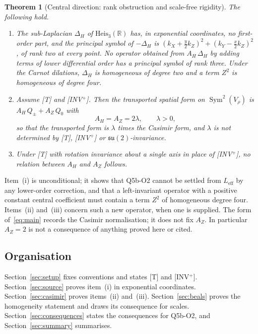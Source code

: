\documentclass[11pt,a4paper]{article}
\newtheorem{theorem}{Theorem}[section]
\theoremstyle{definition}
\theoremstyle{remark}
\DeclareMathOperator{\Sym}{Sym}
\newcommand{\Leff}{L_{\mathrm{eff}}}
\newcommand{\Vr}{V_{\rho}}
\newcommand{\suTwo}{\mathfrak{su}(2)}
\newcommand{\heisR}{\mathrm{Heis}_{3}(\mathbb{R})}
\newcommand{\Az}{A_{Z}}
\newcommand{\AH}{A_{H}}
\begin{document}
      \begin{theorem}[Central direction: rank obstruction and scale-free rigidity]\label{thm:main}
        The following hold.
        \begin{enumerate}
          \item[(i)] The sub-Laplacian $\Delta_H$ of $\heisR$ has, in exponential coordinates, no first-order part,
          and the principal symbol of $-\Delta_H$ is $(k_X + \frac{y}{2}k_Z)^2 + (k_Y - \frac{x}{2}k_Z)^2$, of rank
          two at every point.
          No operator obtained from $\AH\,\Delta_H$ by adding terms of lower differential order has a principal
          symbol of rank three.
          Under the Carnot dilations, $\Delta_H$ is homogeneous of degree two and a term $Z^2$ is homogeneous of
          degree four.
          \item[(ii)] Assume \textup{[T]} and \textup{[INV$^+$]}.
          Then the transported spatial form on $\Sym^2(\Vr)$ is $\AH\,Q_\pm + \Az\,Q_0$ with
          \begin{equation}\label{eq:main}
            \AH = \Az = 2\lambda, \qquad \lambda > 0,
          \end{equation}
          so that the transported form is $\lambda$ times the Casimir form, and $\lambda$ is not determined by
          \textup{[T]}, \textup{[INV$^+$]} or $\suTwo$-invariance.
          \item[(iii)] Under \textup{[T]} with rotation invariance about a single axis in place of \textup{[INV$^+$]},
          no relation between $\AH$ and $\Az$ follows.
        \end{enumerate}
      \end{theorem}

      Item~(i) is unconditional; it shows that Q5b-O2 cannot be settled from $\Leff$ by any lower-order correction,
      and that a left-invariant operator with a positive constant central coefficient must contain a term $Z^2$ of
      homogeneous degree four.
      Items~(ii) and~(iii) concern such a new operator, when one is supplied.
      The form of~\eqref{eq:main} records the Casimir normalisation; it does not fix $\Az$.
      In particular $\Az = 2$ is not a consequence of anything proved here or cited.

    \subsection{Organisation}

      Section~\ref{sec:setup} fixes conventions and states [T] and [INV$^+$].
      Section~\ref{sec:source} proves item~(i) in exponential coordinates.
      Section~\ref{sec:casimir} proves items~(ii) and~(iii).
      Section~\ref{sec:beals} proves the homogeneity statement and draws its consequence for scales.
      Section~\ref{sec:consequences} states the consequences for Q5b-O2, and Section~\ref{sec:summary} summarises.
\end{document}
